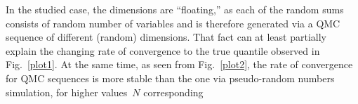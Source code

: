 \begin{multicols}{2}
In the studied case, the dimensions are ``floating,'' as each of the random
sums consists of random number of variables and is therefore
generated via a QMC sequence of different (random) dimensions.
That fact can at least partially explain the changing rate of
convergence to the true quantile observed in Fig.~\ref{plot1}.
At the same time, as seen from Fig.~\ref{plot2}, the rate of
convergence for QMC sequences is more stable than the one via
pseudo-random numbers simulation, for higher values~$N$
corresponding\linebreak\vspace*{-12pt}
\pagebreak

\end{multicols}

\begin{figure} %
\begin{center}
\vspace*{1pt}
\mbox{%
\epsfxsize=77.546mm
}
\end{center}
\vspace*{-6pt}
\vspace*{24pt}
\vspace*{1pt}
\begin{center}
\mbox{%
\epsfxsize=78.546mm
}
\end{center}
\vspace*{-6pt}
\vspace*{6pt}
\end{figure}

